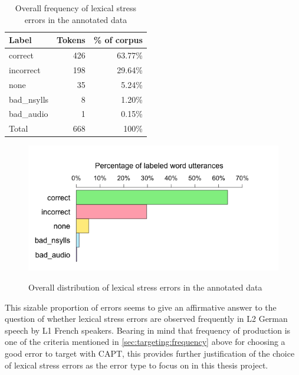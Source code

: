		
		
		\begin{table}[htb]
			\centering
			\caption{Overall frequency of lexical stress errors in the annotated data}
			\begin{tabular}{lrr}
			\toprule
			Label & Tokens & \% of corpus \\
			\midrule
			correct	& 426	& 63.77\% \\
			incorrect &	198	& 29.64\% \\
			none	 &35 &	5.24\% \\
			bad\_nsylls	& 8	& 1.20\% \\
			bad\_audio	& 1	& 0.15\%\\
			\midrule
			Total & 668 & 100\%\\
			\bottomrule
			\end{tabular}
			\label{tab:results:overall}
		\end{table}
		
		
		\begin{figure}[ht]
			\centering
			\caption{Overall distribution of lexical stress errors in the annotated data}
			\includegraphics[width=.7\textwidth]{img/plots/overallJudgments-axisTop-noLabels}
			\label{fig:results:overallbars}
		\end{figure}
		
		
		
		This sizable proportion of errors seems to give an affirmative answer to the question of whether lexical stress errors are observed frequently in L2 German speech by L1 French speakers. Bearing in mind that frequency of production is one of the criteria mentioned in \cref{sec:targeting:frequency} above for choosing a good error to target with CAPT, this provides further justification of the choice of lexical stress errors as the error type to focus on in this thesis project.
		
